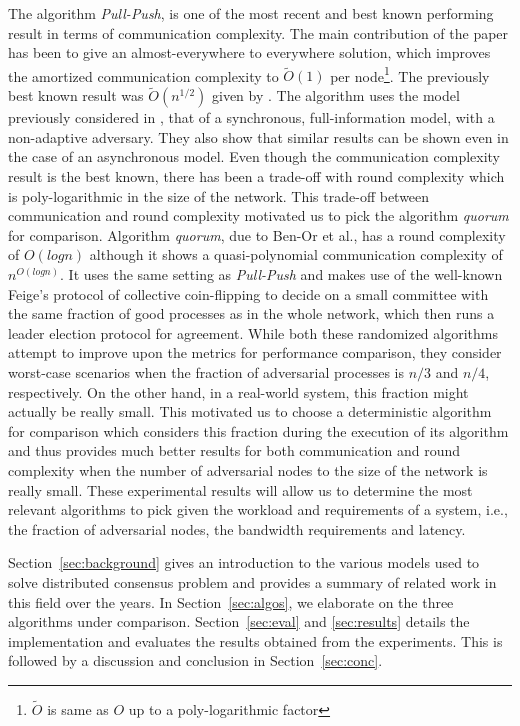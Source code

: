 The algorithm \textit{Pull-Push}, is one of the most recent and best known performing result in terms of communication complexity. The main contribution of the paper has been to give an almost-everywhere to everywhere solution, which improves the amortized communication complexity to $\tilde{O}(1)$ per node\footnote{$\tilde{O}$ is same as $O$ up to a poly-logarithmic factor}. The previously best known result was $\tilde{O}(n^{1/2})$ given by \cite{KLST11}. The algorithm uses the model previously considered in \cite{KLST11,KSSV06,BPV06,KS09}, that of a synchronous, full-information model, with a non-adaptive adversary. They also show that similar results can be shown even in the case of an asynchronous model. Even though the communication complexity result is the best known, there has been a trade-off with round complexity which is poly-logarithmic in the size of the network. This trade-off between communication and round complexity motivated us to pick the algorithm \textit{quorum} for comparison. Algorithm \textit{quorum}, due to Ben-Or et al., has a round complexity of $O(logn)$ although it shows a quasi-polynomial communication complexity of $n^{O(logn)}$. It uses the same setting as \textit{Pull-Push} and makes use of the well-known Feige's protocol of collective coin-flipping to decide on a small committee with the same fraction of good processes as in the whole network, which then runs a leader election protocol for agreement. While both these randomized algorithms attempt to improve upon the metrics for performance comparison, they consider worst-case scenarios when the fraction of adversarial processes is $n/3$ and $n/4$, respectively. On the other hand, in a real-world system, this fraction might actually be really small. This motivated us to choose a deterministic algorithm for comparison which considers this fraction during the execution of its algorithm and thus provides much better results for both communication and round complexity when the number of adversarial nodes to the size of the network is really small. These experimental results will allow us to determine the most relevant algorithms to pick given the workload and requirements of a system, i.e., the fraction of adversarial nodes, the bandwidth requirements and latency. 


Section~\ref{sec:background} gives an introduction to the various models used to solve distributed consensus problem and provides a summary of related work in this field over the years. In Section~\ref{sec:algos}, we elaborate on the three algorithms under comparison. Section~\ref{sec:eval} and \ref{sec:results} details the implementation and evaluates the results obtained from the experiments. This is followed by a discussion and conclusion in Section~\ref{sec:conc}.

